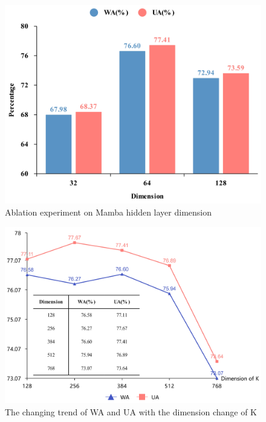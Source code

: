 \documentclass[runningheads]{llncs}
\begin{document}
\begin{figure}[htbp]
\centering
\includegraphics[width=0.9\linewidth]{mamba_dimension.jpg}
\caption{Ablation experiment on Mamba hidden layer dimension}
\label{mamba_exp}
\end{figure}

\begin{figure}[htbp]
\centering
\includegraphics[width=1.\linewidth]{line_322.jpg}
\caption{The changing trend of WA and UA with the dimension change of K}
\label{line}
\end{figure}
\end{document}
